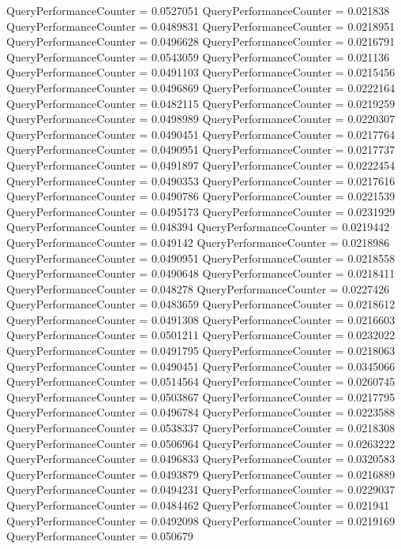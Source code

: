 \documentclass[9pt]{article}
\theoremstyle{plain}
\theoremstyle{definition}
\theoremstyle{remark}
\numberwithin{equation}{section}
\begin{document}
QueryPerformanceCounter  =  0.0527051
QueryPerformanceCounter  =  0.021838
QueryPerformanceCounter  =  0.0489831
QueryPerformanceCounter  =  0.0218951
QueryPerformanceCounter  =  0.0496628
QueryPerformanceCounter  =  0.0216791
QueryPerformanceCounter  =  0.0543059
QueryPerformanceCounter  =  0.021136
QueryPerformanceCounter  =  0.0491103
QueryPerformanceCounter  =  0.0215456
QueryPerformanceCounter  =  0.0496869
QueryPerformanceCounter  =  0.0222164
QueryPerformanceCounter  =  0.0482115
QueryPerformanceCounter  =  0.0219259
QueryPerformanceCounter  =  0.0498989
QueryPerformanceCounter  =  0.0220307
QueryPerformanceCounter  =  0.0490451
QueryPerformanceCounter  =  0.0217764
QueryPerformanceCounter  =  0.0490951
QueryPerformanceCounter  =  0.0217737
QueryPerformanceCounter  =  0.0491897
QueryPerformanceCounter  =  0.0222454
QueryPerformanceCounter  =  0.0490353
QueryPerformanceCounter  =  0.0217616
QueryPerformanceCounter  =  0.0490786
QueryPerformanceCounter  =  0.0221539
QueryPerformanceCounter  =  0.0495173
QueryPerformanceCounter  =  0.0231929
QueryPerformanceCounter  =  0.048394
QueryPerformanceCounter  =  0.0219442
QueryPerformanceCounter  =  0.049142
QueryPerformanceCounter  =  0.0218986
QueryPerformanceCounter  =  0.0490951
QueryPerformanceCounter  =  0.0218558
QueryPerformanceCounter  =  0.0490648
QueryPerformanceCounter  =  0.0218411
QueryPerformanceCounter  =  0.048278
QueryPerformanceCounter  =  0.0227426
QueryPerformanceCounter  =  0.0483659
QueryPerformanceCounter  =  0.0218612
QueryPerformanceCounter  =  0.0491308
QueryPerformanceCounter  =  0.0216603
QueryPerformanceCounter  =  0.0501211
QueryPerformanceCounter  =  0.0232022
QueryPerformanceCounter  =  0.0491795
QueryPerformanceCounter  =  0.0218063
QueryPerformanceCounter  =  0.0490451
QueryPerformanceCounter  =  0.0345066
QueryPerformanceCounter  =  0.0514564
QueryPerformanceCounter  =  0.0260745
QueryPerformanceCounter  =  0.0503867
QueryPerformanceCounter  =  0.0217795
QueryPerformanceCounter  =  0.0496784
QueryPerformanceCounter  =  0.0223588
QueryPerformanceCounter  =  0.0538337
QueryPerformanceCounter  =  0.0218308
QueryPerformanceCounter  =  0.0506964
QueryPerformanceCounter  =  0.0263222
QueryPerformanceCounter  =  0.0496833
QueryPerformanceCounter  =  0.0320583
QueryPerformanceCounter  =  0.0493879
QueryPerformanceCounter  =  0.0216889
QueryPerformanceCounter  =  0.0494231
QueryPerformanceCounter  =  0.0229037
QueryPerformanceCounter  =  0.0484462
QueryPerformanceCounter  =  0.021941
QueryPerformanceCounter  =  0.0492098
QueryPerformanceCounter  =  0.0219169
QueryPerformanceCounter  =  0.050679
\end{document}
